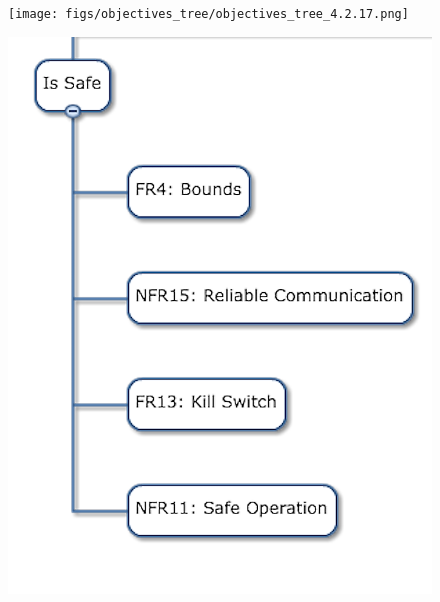 \begin{figure}[h!]
\centering
\texttt{[image: figs/objectives\_tree/objectives\_tree\_4.2.17.png]}
\label{fig:obj_tree_full}
\end{figure}
\begin{figure}[h!]
\centering
\includegraphics[width=0.98\columnwidth]{figs/objectives_tree/objectives_tree_safe.png}
\label{fig:obj_tree_safe}
\end{figure}
